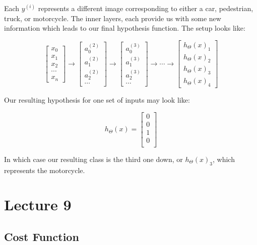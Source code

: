 \documentclass[UTF8]{article}
\begin{document}
Each $y^{(i)}$ represents a different image corresponding to either a car, pedestrian, truck, or motorcycle. The inner layers, each provide us with some new information which leads to our final hypothesis function. The setup looks like:

$$\begin{bmatrix}x_0 \\ x_1 \\ x_2 \\ \cdots \\ x_n \end{bmatrix} \rightarrow \begin{bmatrix}a^{(2)}_0 \\ a^{(2)}_1 \\ a^{(2)}_2 \\ \cdots \end{bmatrix} \rightarrow \begin{bmatrix}a^{(3)}_0 \\ a^{(3)}_1 \\ a^{(3)}_2 \\ \cdots \end{bmatrix} \rightarrow \cdots \rightarrow \begin{bmatrix}h_\Theta(x)_1 \\ h_\Theta(x)_2 \\ h_\Theta(x)_3 \\ h_\Theta(x)_4 \end{bmatrix}$$

Our resulting hypothesis for one set of inputs may look like:

$$h_\Theta(x) =\begin{bmatrix}0 \\ 0 \\ 1 \\ 0 \\\end{bmatrix}$$

In which case our resulting class is the third one down, or $h_\Theta(x)_3$, which represents the motorcycle.

\newpage

\section{Lecture 9}

\subsection{Cost Function}
\end{document}
